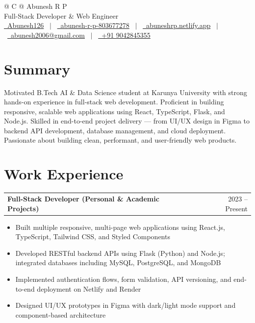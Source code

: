 \documentclass[a4paper,12pt]{article}
\makeatletter
\newenvironment{joblong}[2]
    {
    \begin{tabularx}{\linewidth}{@{}l X r@{}}
    \textbf{#1} & \hfill & #2 \\[2pt]
    \end{tabularx}
    \begin{minipage}[t]{\linewidth}
    \begin{itemize}[nosep,after=\strut, leftmargin=1em, itemsep=2pt,label=--]
    }
    {
    \end{itemize}
    \end{minipage}
    }
\makeatother
\begin{document}
\pagestyle{empty}

\begin{tabularx}{\linewidth}{@{} C @{}}
\Huge{Abunesh R P} \\[5pt]
\normalsize{Full-Stack Developer \& Web Engineer} \\[3pt]
\href{https://github.com/Abunesh126}{\raisebox{-0.05\height}\faGithub\ Abunesh126} \ $|$ \
\href{https://linkedin.com/in/abunesh-r-p-803677278}{\raisebox{-0.05\height}\faLinkedin\ abunesh-r-p-803677278} \ $|$ \
\href{https://abuneshrp.netlify.app}{\raisebox{-0.05\height}\faGlobe\ abuneshrp.netlify.app} \ $|$ \
\href{mailto:abunesh2006@gmail.com}{\raisebox{-0.05\height}\faEnvelope\ abunesh2006@gmail.com} \ $|$ \
\href{tel:+919042845355}{\raisebox{-0.05\height}\faMobile\ +91 9042845355} \\
\end{tabularx}

\section{Summary}
Motivated B.Tech AI \& Data Science student at Karunya University with strong hands-on experience in full-stack web development. Proficient in building responsive, scalable web applications using React, TypeScript, Flask, and Node.js. Skilled in end-to-end project delivery — from UI/UX design in Figma to backend API development, database management, and cloud deployment. Passionate about building clean, performant, and user-friendly web products.

\section{Work Experience}

\begin{joblong}{Full-Stack Developer (Personal \& Academic Projects)}{2023 -- Present}
\item Built multiple responsive, multi-page web applications using React.js, TypeScript, Tailwind CSS, and Styled Components
\item Developed RESTful backend APIs using Flask (Python) and Node.js; integrated databases including MySQL, PostgreSQL, and MongoDB
\item Implemented authentication flows, form validation, API versioning, and end-to-end deployment on Netlify and Render
\item Designed UI/UX prototypes in Figma with dark/light mode support and component-based architecture
\end{joblong}
\end{document}
